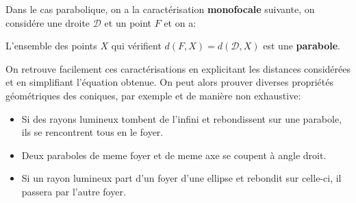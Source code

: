 Dans le cas parabolique, on a la caractérisation \textbf{monofocale} suivante, on considére une droite \(\mathcal{D}\) et un point \(F\) et on a:
\begin{center}
   L'ensemble des points \(X\) qui vérifient \(d(F, X) = d(\mathcal{D}, X)\) est une \textbf{parabole}.
\end{center}
On retrouve facilement ces caractérisations en explicitant les distances considérées et en simplifiant l'équation obtenue. On peut alors prouver diverses propriétés géométriques des coniques, par exemple et de manière non exhaustive:
\begin{itemize}
   \item Si des rayons lumineux tombent de l'infini et rebondissent sur une parabole, ils se rencontrent tous en le foyer.
   \item Deux paraboles de meme foyer et de meme axe se coupent à angle droit.
   \item Si un rayon lumineux part d'un foyer d'une ellipse et rebondit sur celle-ci, il passera par l'autre foyer.
\end{itemize}

\subsection*{}

\chapter*{} %

